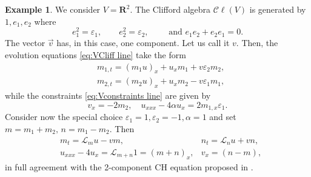 \documentclass[10pt,a4paper]{article}
\numberwithin{equation}{section}
\theoremstyle{plain}
\theoremstyle{definition}
\newtheorem{example}[example]{Example}
\newcommand{\R}{\mathbf{R}}
\renewcommand{\epsilon}{\varepsilon}
\newcommand\Cl{\mathcal{C}\ell}
\begin{document}
\begin{example}
We consider $V=\R^2$.  The Clifford algebra $\Cl(V)$ is generated by $1, e_1, e_2$ where 
\begin{equation} 
e_1^2=\epsilon_1,\qquad e_2^2=\epsilon_2, \qquad \text{ and } e_1e_2+e_2e_1=0.  
\end{equation}
The vector $\vec{v}$ has, in this case, one component.  Let us call it $v$.  Then, the evolution equations \eqref{eq:VCliff line} take the form
\begin{align}
&m_{1,t}=(m_1u)_x+u_xm_1+v\epsilon_2 m_2, \\
&m_{2,t}=(m_2u)_x+u_xm_2-v\epsilon_1 m_1,  
\end{align}
while the constraints \eqref{eq:Vconstraints line} are given by
\begin{equation} 
v_x=-2 m_2, \quad u_{xxx}-4\alpha u_x=2m_{1,x} \epsilon_1.  
\end{equation} 
Consider now the special choice $\epsilon_1=1, \epsilon_2=-1, \alpha=1$ and set $m=m_1+m_2, \, n=m_1-m_2$.  
Then 
\begin{align}
&m_t=\mathcal{L}_m u -v m, &n_t=\mathcal{L}_n u+vn, \\
&u_{xxx}-4 u_x=\mathcal{L}_{m+n} 1=(m+n)_x, &v_x=(n-m),   
\end{align}
in full agreement with the 2-component CH equation proposed in \cite{beals-szmigielski:2021p:2CH-euler-bernoulli-beam-noncommutative-continued-fractions}.  
\end{example} 
\end{document}
